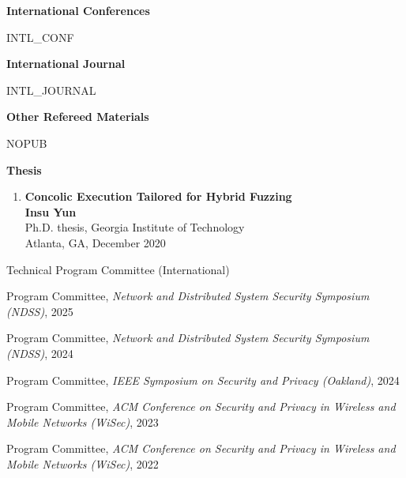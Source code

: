 \documentclass[11pt,letterpaper]{article}
\begin{document}
%
%


\textbf{International Conferences }
\begin{enumerate}
  {{ INTL_CONF }}
\end{enumerate}

\textbf{International Journal}
\begin{enumerate}[resume]
  {{ INTL_JOURNAL }}
\end{enumerate}

\begin{comment}
\textbf{Domestic Conferences}
\begin{enumerate}[resume]
  {{ DOM_CONF }}
\end{enumerate}
\end{comment}

\textbf{Other Refereed Materials}
\begin{enumerate}[resume]
  {{ NOPUB }}
\end{enumerate}

\textbf{Thesis}
\begin{enumerate}[resume]
\item \textbf{Concolic Execution Tailored for Hybrid Fuzzing}  \\
{\footnotesize
  \textbf{Insu Yun} \\
  Ph.D. thesis, Georgia Institute of Technology \\
Atlanta, GA, December 2020
}
\end{enumerate}

\begin{topic}{Technical Program Committee (International)}{}
  \item{Program Committee, \emph{Network and Distributed System Security Symposium (NDSS)}, 2025} %
  \item{Program Committee, \emph{Network and Distributed System Security Symposium (NDSS)}, 2024} %
  \item{Program Committee, \emph{IEEE Symposium on Security and Privacy (Oakland)}, 2024} %
  \item{Program Committee, \emph{ACM Conference on Security and Privacy in Wireless and Mobile Networks (WiSec)}, 2023} %
  \item{Program Committee, \emph{ACM Conference on Security and Privacy in Wireless and Mobile Networks (WiSec)}, 2022} %
\end{topic}
\end{document}
